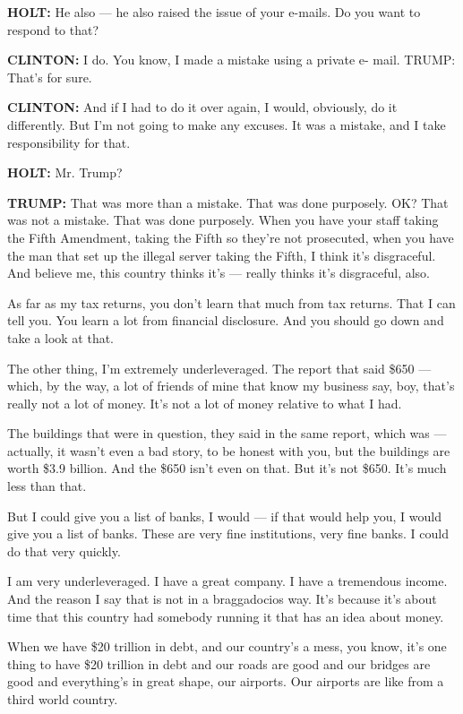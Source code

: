 \textbf{HOLT:} He also --- he also raised the issue of your e-mails. Do
you want to respond to that?

\textbf{CLINTON:} I do. You know, I made a mistake using a private e-
mail. TRUMP: That's for sure.

\textbf{CLINTON:} And if I had to do it over again, I would, obviously,
do it differently. But I'm not going to make any excuses. It was a
mistake, and I take responsibility for that.

\textbf{HOLT:} Mr. Trump?

\textbf{TRUMP:} That was more than a mistake. That was done purposely.
OK? That was not a mistake. That was done purposely. When you have your
staff taking the Fifth Amendment, taking the Fifth so they're not
prosecuted, when you have the man that set up the illegal server taking
the Fifth, I think it's disgraceful. And believe me, this country thinks
it's --- really thinks it's disgraceful, also.

As far as my tax returns, you don't learn that much from tax returns.
That I can tell you. You learn a lot from financial disclosure. And you
should go down and take a look at that.

The other thing, I'm extremely underleveraged. The report that said
\$650 --- which, by the way, a lot of friends of mine that know my
business say, boy, that's really not a lot of money. It's not a lot of
money relative to what I had.

The buildings that were in question, they said in the same report, which
was --- actually, it wasn't even a bad story, to be honest with you, but
the buildings are worth \$3.9 billion. And the \$650 isn't even on that.
But it's not \$650. It's much less than that.

But I could give you a list of banks, I would --- if that would help
you, I would give you a list of banks. These are very fine institutions,
very fine banks. I could do that very quickly.

I am very underleveraged. I have a great company. I have a tremendous
income. And the reason I say that is not in a braggadocios way. It's
because it's about time that this country had somebody running it that
has an idea about money.

When we have \$20 trillion in debt, and our country's a mess, you know,
it's one thing to have \$20 trillion in debt and our roads are good and
our bridges are good and everything's in great shape, our airports. Our
airports are like from a third world country.

